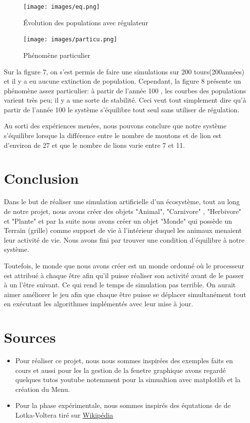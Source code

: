 \documentclass[a4paper,12pt]{article} %
\begin{document}
\begin{figure}[h]
    \begin{minipage}[c]{.46\linewidth}
        \centering
        \texttt{[image: images/eq.png]}
        \caption{Évolution des populations avec régulateur}
    \end{minipage}
    \hfill%
    \begin{minipage}[c]{.46\linewidth}
        \centering
        \texttt{[image: images/particu.png]}
        \caption{Phénomène particulier}
    \end{minipage}
\end{figure}

Sur la figure 7, on s'est permis de faire une simulations sur 200 tours(200années) et il y a eu aucune extinction de population.
Cependant, la figure 8 présente un phénomène assez particulier: à partir de l'année 100 , les courbes des populations varient très peu; il y a une sorte de stabilité. Ceci veut tout simplement dire qu'à partir de l'année 100 le système s'équilibre tout seul sans utiliser de régulation.

Au sorti des expériences menées, nous pouvons conclure que notre système s'équilibre lorsque la différence entre le nombre de moutons et de lion est d'environ de 27 et que le nombre de lions varie entre 7 et 11.

\section{Conclusion}
Dans le but de réaliser une simulation artificielle d'un écosystème, tout au long de notre projet, nous avons créer des objets "Animal", "Carnivore" , "Herbivore" et "Plante" et par la suite nous avons créer un objet "Monde" qui possède un Terrain (grille) comme support de vie à l'intérieur duquel les animaux menaient leur activité de vie. Nous avons fini par trouver une condition d'équilibre à notre système.

Toutefois, le monde que nous avons créer est un monde ordonné où le processeur est attribué à chaque être afin qu'il puisse réaliser son activité avant de le passer à un l'être suivant. Ce qui rend le temps de simulation pas terrible. On aurait aimer améliorer le jeu afin que chaque être puisse se déplacer simultanément tout en exécutant les algorithmes implémentés avec leur mise à jour.

\newpage
\appendix
\section{Sources}

\begin{itemize}
    \item Pour réaliser ce projet, nous nous sommes inspirées des exemples faits en cours et aussi pour les la gestion de la fenetre graphique avons regardé quelques tutos youtube notemment pour la simualtion avec matplotlib et la création du Menu.
    \item Pour la phase expérimentale, nous sommes inspirés des équtations de de Lotka-Voltera tiré sur  \href{https://fr.wikipedia.org/wiki/\%C3\%89quations_de_pr\%C3\%A9dation_de_Lotka-Volterra}{Wikipédia}
\end{itemize}
\end{document}
